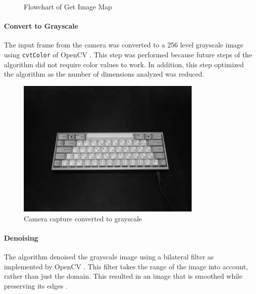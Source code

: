 \documentclass{report}
\begin{document}
\begin{figure}[H]
	\caption{Flowchart of Get Image Map}
	\label{fig:metho-algo-key-image-map}
\end{figure}

\newpage

\paragraph{Convert to Grayscale}
The input frame from the camera was converted to a 256 level grayscale image
using \texttt{cvtColor} of OpenCV \parencite{opencv-cvtColor}. This step was
performed because future steps of the algorithm did not require color values to
work. In addition, this step optimized the algorithm as the number of dimensions
analyzed was reduced.

\begin{figure}[H]
	\centering
	\includegraphics[width=0.8\textwidth]{grayscale.png}
	\caption{Camera capture converted to grayscale}
	\centering
\end{figure}

\paragraph{Denoising}
The algorithm denoised the grayscale image using a bilateral filter as
implemented by OpenCV \parencite{opencv-bilateral-filter}. This filter takes the
range of the image into account, rather than just the domain. This resulted in
an image that is smoothed while preserving its edges
\parencite{bilateral-filter}.
\end{document}
